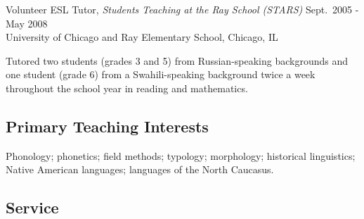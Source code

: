 \documentclass[11pt]{article}
\newenvironment{myindentpar}[1]%
 {\begin{list}{}%
         {\setlength{\leftmargin}{#1}}%
         \item[]%
 }
 {\end{list}}
\begin{document}
\noindent Volunteer ESL Tutor, \textit{Students Teaching at the Ray School (STARS)} \hfill Sept.~2005 - May 2008 \\
University of Chicago and Ray Elementary School, Chicago, IL

\begin{myindentpar}{0.45in}
Tutored two students (grades 3 and 5) from Russian-speaking backgrounds and one student (grade 6) from a Swahili-speaking background twice a week throughout the school year in reading and mathematics.
\end{myindentpar}

\subsection*{Primary Teaching Interests}

Phonology; phonetics; field methods; typology; morphology; historical linguistics; Native American languages; languages of the North Caucasus.

\subsection*{Service}
\end{document}

